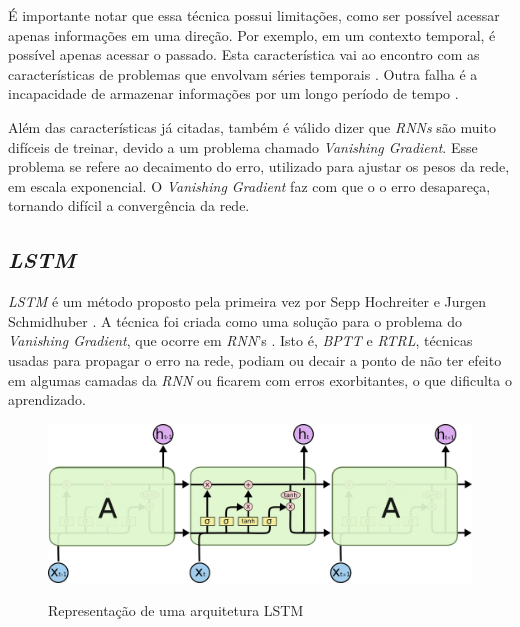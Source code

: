É importante notar que essa técnica possui limitações, como ser possível acessar apenas informações em uma direção. Por exemplo, em um contexto temporal, é possível apenas acessar o passado. Esta característica vai ao encontro com as características de problemas que envolvam séries temporais \cite{alex2012}. Outra falha é a incapacidade de armazenar informações por um longo período de tempo \cite{hochreiter2001gradient}. 

Além das características já citadas, também é válido dizer que \textit{\acrshort{RNN}s} são muito difíceis de treinar, devido a um problema chamado \textit{Vanishing Gradient}. Esse problema se refere ao decaimento do erro, utilizado para ajustar os pesos da rede, em escala exponencial. O \textit{Vanishing Gradient} faz com que o o erro desapareça, tornando difícil a convergência da rede. \cite{doi:10.1162/neco.1997.9.8.1735}

\subsection{\textit{\acrfull{LSTM}}}

\textit{\acrshort{LSTM}} é um método proposto pela primeira vez por Sepp Hochreiter e Jurgen Schmidhuber \cite{doi:10.1162/neco.1997.9.8.1735}. A técnica foi criada como uma solução para o problema do \textit{Vanishing Gradient}, que ocorre em \textit{\acrshort{RNN}}'s \cite{doi:10.1162/neco.1997.9.8.1735}. Isto é, \textit{\acrfull{BPTT}} e \textit{\acrfull{RTRL}}, técnicas usadas para propagar o erro na rede, podiam ou decair a ponto de não ter efeito em algumas camadas da \textit{\acrshort{RNN}} ou ficarem com erros exorbitantes, o que dificulta o aprendizado. 

\begin{figure}[htbp]
    \centering
    \includegraphics[scale=0.4]{monography/img/models/lstm3.png}
    \label{figure:lstm}
    \caption[Representação de uma arquitetura LSTM]{Representação de uma arquitetura LSTM\footnotemark}
\end{figure}

